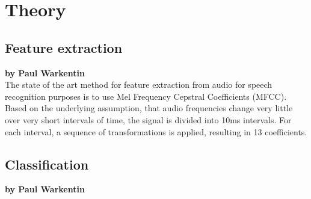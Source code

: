 \chapter{Theory}

\section{Feature extraction}

\textbf{by Paul Warkentin} \\

The state of the art method for feature extraction from audio for speech recognition purposes is to use Mel Frequency Cepstral Coefficients (MFCC). Based on the underlying assumption, that audio frequencies change very little over very short intervals of time, the signal is divided into 10ms intervals. For each interval, a sequence of transformations is applied, resulting in 13 coefficients.



\section{Classification}

\textbf{by Paul Warkentin} \\
